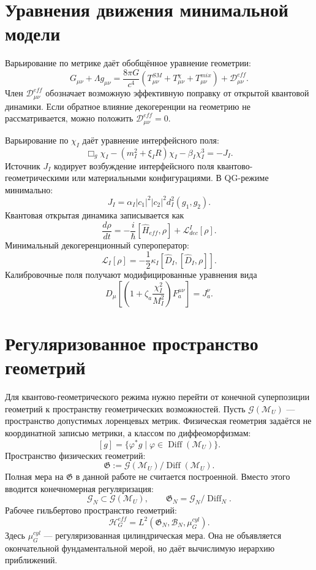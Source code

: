 \documentclass[12pt,a4paper]{article}
\DeclareMathOperator{\Diff}{Diff}
\newcommand{\M}{\mathcal M_U}
\newcommand{\Hilb}{\mathcal H}
\newcommand{\gfrak}{\mathfrak G}
\begin{document}
\section{Уравнения движения минимальной модели}
Варьирование по метрике даёт обобщённое уравнение геометрии:
\[
\boxed{
G_{\mu\nu}+\Lambda g_{\mu\nu}
=\frac{8\pi G}{c^4}\left(T_{\mu\nu}^{SM}+T_{\mu\nu}^{\chi}+T_{\mu\nu}^{mix}\right)+\mathcal D_{\mu\nu}^{eff}.
}
\]
Член $\mathcal D_{\mu\nu}^{eff}$ обозначает возможную эффективную поправку от открытой квантовой динамики. Если обратное влияние декогеренции на геометрию не рассматривается, можно положить $\mathcal D_{\mu\nu}^{eff}=0$.

Варьирование по $\chi_I$ даёт уравнение интерфейсного поля:
\[
\boxed{
\Box_g\chi_I-(m_I^2+\xi_I R)\chi_I-\beta_I\chi_I^3=-J_I.
}
\]
Источник $J_I$ кодирует возбуждение интерфейсного поля квантово-геометрическими или материальными конфигурациями. В QG-режиме минимально:
\[
\boxed{J_I=\alpha_I |c_1|^2|c_2|^2d_I^2(g_1,g_2).}
\]
Квантовая открытая динамика записывается как
\[
\boxed{
\frac{d\rho}{dt}=-\frac{i}{\hbar}[\widehat H_{eff},\rho]+\mathcal L_{dec}^{I}[\rho].
}
\]
Минимальный декогеренционный супероператор:
\[
\boxed{
\mathcal L_I[\rho]=-\frac{1}{2}\kappa_I[\widehat D_I,[\widehat D_I,\rho]].
}
\]
Калибровочные поля получают модифицированные уравнения вида
\[
\boxed{
D_\mu\left[\left(1+\zeta_a\frac{\chi_I^2}{M_I^2}\right)F_a^{\mu\nu}\right]=J_a^\nu.
}
\]

\section{Регуляризованное пространство геометрий}
Для квантово-геометрического режима нужно перейти от конечной суперпозиции геометрий к пространству геометрических возможностей. Пусть $\mathcal G(\M)$ — пространство допустимых лоренцевых метрик. Физическая геометрия задаётся не координатной записью метрики, а классом по диффеоморфизмам:
\[
\boxed{[g]=\{\varphi^*g\mid \varphi\in\Diff(\M)\}.}
\]
Пространство физических геометрий:
\[
\boxed{\gfrak:=\mathcal G(\M)/\Diff(\M).}
\]
Полная мера на $\gfrak$ в данной работе не считается построенной. Вместо этого вводится конечномерная регуляризация:
\[
\boxed{\mathcal G_N\subset\mathcal G(\M),\qquad \gfrak_N=\mathcal G_N/\Diff_N.}
\]
Рабочее гильбертово пространство геометрий:
\[
\boxed{
\Hilb_G^{eff}=L^2(\gfrak_N,\mathcal B_N,\mu_G^{cyl}).
}
\]
Здесь $\mu_G^{cyl}$ — регуляризованная цилиндрическая мера. Она не объявляется окончательной фундаментальной мерой, но даёт вычислимую иерархию приближений.
\end{document}
